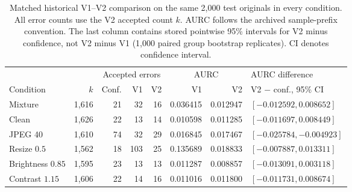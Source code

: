 \begin{table}[t]
\caption{Matched historical V1--V2 comparison on the same 2,000 test originals in every condition. All error counts use the V2 accepted count $k$. AURC follows the archived sample-prefix convention. The last column contains stored pointwise 95\% intervals for V2 minus confidence, not V2 minus V1 (1,000 paired group bootstrap replicates). CI denotes confidence interval.}
\label{tab:selector_v1_v2}
\centering
\begingroup
\fontsize{8}{9.6}\selectfont
\setlength{\tabcolsep}{3pt}
\renewcommand{\arraystretch}{1.12}
\begin{tabular*}{\textwidth}{@{\extracolsep{\fill}}lrrrrrrl@{}}
\toprule
 & & \multicolumn{3}{c}{Accepted errors} & \multicolumn{2}{c}{AURC} & AURC difference \\
\cmidrule(lr){3-5}\cmidrule(lr){6-7}
Condition & $k$ & Conf. & V1 & V2 & V1 & V2 & V2 $-$ conf., 95\% CI \\
\midrule
Mixture & 1,616 & 21 & 32 & 16 & 0.036415 & 0.012947 & $[-0.012592,0.008652]$ \\
Clean & 1,626 & 22 & 13 & 14 & 0.010598 & 0.011285 & $[-0.011697,0.008449]$ \\
JPEG 40 & 1,610 & 74 & 32 & 29 & 0.016845 & 0.017467 & $[-0.025784,-0.004923]$ \\
Resize $0.5$ & 1,562 & 18 & 103 & 25 & 0.135689 & 0.018833 & $[-0.007887,0.013311]$ \\
Brightness $0.85$ & 1,595 & 23 & 13 & 13 & 0.011287 & 0.008857 & $[-0.013091,0.003118]$ \\
Contrast $1.15$ & 1,606 & 22 & 14 & 16 & 0.011016 & 0.011800 & $[-0.011731,0.008674]$ \\
\bottomrule
\end{tabular*}
\endgroup
\end{table}
